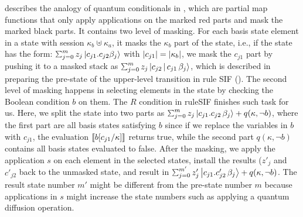 \label{sec:conditionals}
 describes the analogy of quantum conditionals in \qafny, which are partial map functions that only apply applications on the marked red parts and mask the marked black parts.
It contains two level of masking. For each basis state element in a state with session $\kappa_b\uplus \kappa_a$, it masks the $\kappa_b$ part of the state, i.e., if the state has the form: $\sch{m}{z_j}{c_{j1}.c_{j2}\beta_j}$ with $|c_{j1}| = |\kappa_b|$, we mask the $c_{j1}$ part by pushing it to a masked stack as $\sch{m}{z_j}{c_{j2}\,|\,c_{j1}\,\beta_j}$, which is described in preparing the pre-state of the upper-level transition in rule \textsc{SIF} ().
The second level of masking happens in selecting elements in the state by checking the Boolean condition $b$ on them.
The $R$ condition in rule\textsc{SIF} finishes such task for us.
Here, we split the state into two parts as $\sch{m}{z_j}{c_{j1}.c_{j2}\,\beta_j}+q(\kappa,\neg b)$, where the first part are all basis states satisfying $b$ since if we replace the variables in $b$ with $c_{j1}$, the evaluation $\llbracket b[c_{j1}/\kappa] \rrbracket$ returns true, while the second part $q(\kappa,\neg b)$ contains all basis states evaluated to false.
After the masking, we apply the application $s$ on each element in the selected states, install the results ($z'_j$ and $c'_{j2}$ back to the unmasked state, and result in $\sch{m'}{z'_j}{c_{j1}.c'_{j2}\,\beta_j}+q(\kappa,\neg b)$.
The result state number $m'$ might be different from the pre-state number $m$ because applications in $s$ might increase the state numbers such as applying a quantum diffusion operation.

